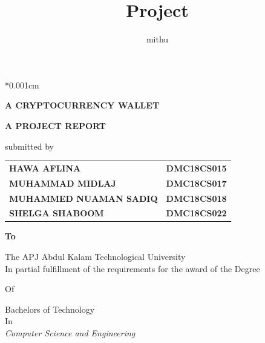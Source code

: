 \documentclass[12pt]{article}
\title{Project}
\author{mithu}
\date{ }
\begin{document}
\newenvironment{changemargin}[3]{%
\begin{list}{}{%
\setlength{\topsep}{0pt}%
\setlength{\leftmargin}{#1}%
\setlength{\rightmargin}{#2}%
\setlength{\listparindent}{\parindent}%
\setlength{\itemindent}{\parindent}%
\setlength{\parsep}{\parskip}%
}%
\item[]}{\end{list}
}

\newenvironment{boxed}[1]
    {
	\pagenumbering{roman}
      
    }





\vspace*{0.001cm}
\begin{center}\large \textbf{A CRYPTOCURRENCY WALLET}
 \end{center} 
\vspace{0.17cm}
 \begin{center}\textbf{A PROJECT REPORT}\end{center}
\vspace*{0.001cm}
\begin{center}submitted by\end{center}
\vspace*{0.001cm}
\begin{center}
\begin{tabular}{l l}
\bf{HAWA AFLINA} & \bf{DMC18CS015} \\
\bf{MUHAMMAD MIDLAJ} & \bf{DMC18CS017} \\
\bf{MUHAMMED NUAMAN SADIQ} & \bf{DMC18CS018} \\
\bf{SHELGA SHABOOM} & \bf{DMC18CS022} \\

\end{tabular}
\end{center}
\vspace*{0.001cm}
\begin{center}\bf{To} \end{center}
\vspace*{0.001cm}
\begin{center}The APJ Abdul Kalam Technological University \\
In partial fulfillment of the requirements for the award of the Degree\end{center}
\vspace{0.001cm}
\begin{center}Of\end{center}
\vspace*{0.001cm}
\begin{center}Bachelors of Technology \\ In\\
\emph{Computer Science and Engineering}\end{center}
\end{document}

